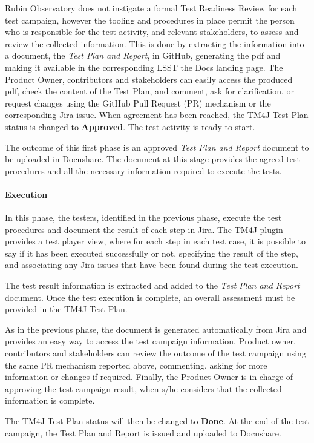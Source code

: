 Rubin Observatory does not instigate a formal Test Readiness Review for each test campaign,
however the tooling and procedures in place permit the person who is responsible for the test activity, and relevant stakeholders, to assess and review the collected information.
This is done by extracting the information into a document, the \textit{Test Plan and Report}, in GitHub, generating the pdf and making it available
in the corresponding LSST the Docs landing page. The Product Owner, contributors and stakeholders can easily access the produced pdf,
check the content of the Test Plan, and comment, ask for clarification, or request changes using the GitHub
Pull Request (PR) mechanism or the corresponding Jira issue. 
When agreement has been reached, the TM4J Test Plan status is changed to \textbf{Approved}. The test activity is ready to start.

The outcome of this first phase is an approved \textit{Test Plan and Report} document to be uploaded in Docushare.
The document at this stage provides the agreed test procedures and all the necessary information required to execute the tests.

\paragraph{Execution}
In this phase, the testers, identified in the previous phase, execute the test procedures and
document the result of each step in Jira.
The TM4J plugin provides a test player view, where for each step in each test case, it is possible to say if it has been executed successfully or not,
specifying the result of the step, and associating any Jira issues that have been found during the test execution.

The test result information is extracted and added to the \textit{Test Plan and Report} document.
Once the test execution is complete, an overall assessment must be provided in the TM4J Test Plan.

As in the previous phase, the document is generated automatically from Jira and provides an easy way to access the test campaign information.
Product owner, contributors and stakeholders can review the outcome of the test campaign 
using the same PR mechanism reported above, commenting, asking for more information or changes if required.
Finally, the Product Owner is in charge of approving the test campaign result, when s/he considers that the collected information is complete.

The TM4J Test Plan status will then be changed to \textbf{Done}.
At the end of the test campaign, the Test Plan and Report is issued and uploaded to Docushare.


